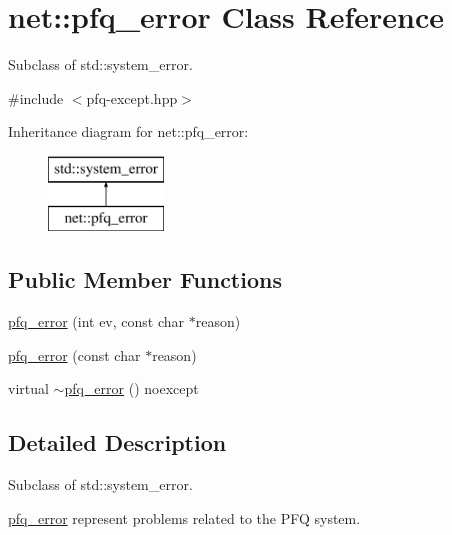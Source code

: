 \hypertarget{classnet_1_1pfq__error}{\section{net\+:\+:pfq\+\_\+error Class Reference}
\label{classnet_1_1pfq__error}
}


Subclass of std\+::system\+\_\+error.  




{\ttfamily \#include $<$pfq-\/except.\+hpp$>$}

Inheritance diagram for net\+:\+:pfq\+\_\+error\+:\begin{figure}[H]
\begin{center}
\leavevmode
\includegraphics[height=2.000000cm]{classnet_1_1pfq__error}
\end{center}
\end{figure}
\subsection*{Public Member Functions}
\begin{DoxyCompactItemize}
\item 
\hyperlink{classnet_1_1pfq__error_af2d9de405f6302a2b086d124cebefd82}{pfq\+\_\+error} (int ev, const char $\ast$reason)
\item 
\hyperlink{classnet_1_1pfq__error_aad416b1835ae059b8907a1c94e695a2c}{pfq\+\_\+error} (const char $\ast$reason)
\item 
virtual \hyperlink{classnet_1_1pfq__error_abc9c3391a06f55507153b6acbb896eef}{$\sim$pfq\+\_\+error} () noexcept
\end{DoxyCompactItemize}


\subsection{Detailed Description}
Subclass of std\+::system\+\_\+error. 

\hyperlink{classnet_1_1pfq__error}{pfq\+\_\+error} represent problems related to the P\+F\+Q system. 

